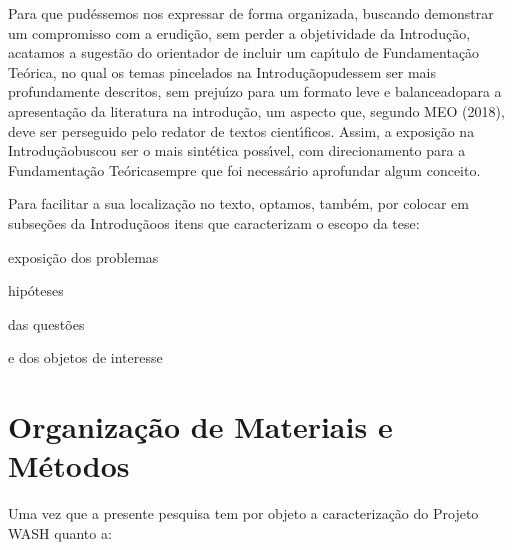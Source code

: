 \documentclass[
12pt,		%
openright,	%
twoside,  %
a4paper,			%
chapter=TITLE,		%
english,			%
french,				%
spanish,			%
brazil				%
]{USPSC-classe/USPSC_RedarTex}
\begin{document}
Para que pud\'essemos nos expressar de forma organizada, buscando demonstrar um compromisso com a erudi\c{c}\~ao, sem perder a objetividade da \textquotedbl Introdu\c{c}\~ao\textquotedbl , acatamos a sugest\~ao do orientador de incluir um cap\'{\i}tulo de \textquotedbl Fundamenta\c{c}\~ao Te\'orica\textquotedbl , no qual os temas pincelados na \textquotedbl Introdu\c{c}\~ao\textquotedbl  pudessem ser mais profundamente descritos, sem preju\'{\i}zo para um formato \textquotedbl leve e balanceado\textquotedbl  para a apresenta\c{c}\~ao da literatura na introdu\c{c}\~ao, um aspecto que, segundo  MEO (2018), deve ser perseguido pelo redator de textos cient\'{\i}ficos. Assim, a exposi\c{c}\~ao na \textquotedbl Introdu\c{c}\~ao\textquotedbl  buscou ser o mais sint\'etica poss\'{\i}vel, com direcionamento para a \textquotedbl Fundamenta\c{c}\~ao Te\'orica\textquotedbl  sempre que foi necess\'ario aprofundar algum conceito.










Para facilitar a sua localiza\c{c}\~ao no texto, optamos, tamb\'em, por colocar em subse\c{c}\~oes da \textquotedbl Introdu\c{c}\~ao\textquotedbl  os itens que caracterizam o escopo da tese:











\begin{alineas}
\item exposi\c{c}\~ao dos problemas
\item hip\'oteses
\item das quest\~oes
\item e dos objetos de interesse
\end{alineas}

\section[Organiza\c{c}\~ao de Materiais e M\'etodos]{Organiza\c{c}\~ao de Materiais e M\'etodos}\label{Organiza\c{c}\~ao de Materiais e M\'etodos}
Uma vez que a presente pesquisa tem por objeto a caracteriza\c{c}\~ao do Projeto WASH quanto a:
\end{document}
